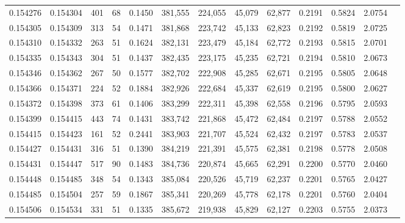 \begin{tabular}{rrrrrrrrrrrrr}
0.154276 & 0.154304 &   401 &  68 &                                     0.1450 & 381,555 & 224,055 &  45,079 &  62,877 & 0.2191 & 0.5824 & 2.0754 \\
0.154305 & 0.154309 &   313 &  54 &                                     0.1471 & 381,868 & 223,742 &  45,133 &  62,823 & 0.2192 & 0.5819 & 2.0725 \\
0.154310 & 0.154332 &   263 &  51 &                                     0.1624 & 382,131 & 223,479 &  45,184 &  62,772 & 0.2193 & 0.5815 & 2.0701 \\
0.154335 & 0.154343 &   304 &  51 &                                     0.1437 & 382,435 & 223,175 &  45,235 &  62,721 & 0.2194 & 0.5810 & 2.0673 \\
0.154346 & 0.154362 &   267 &  50 &                                     0.1577 & 382,702 & 222,908 &  45,285 &  62,671 & 0.2195 & 0.5805 & 2.0648 \\
0.154366 & 0.154371 &   224 &  52 &                                     0.1884 & 382,926 & 222,684 &  45,337 &  62,619 & 0.2195 & 0.5800 & 2.0627 \\
0.154372 & 0.154398 &   373 &  61 &                                     0.1406 & 383,299 & 222,311 &  45,398 &  62,558 & 0.2196 & 0.5795 & 2.0593 \\
0.154399 & 0.154415 &   443 &  74 &                                     0.1431 & 383,742 & 221,868 &  45,472 &  62,484 & 0.2197 & 0.5788 & 2.0552 \\
0.154415 & 0.154423 &   161 &  52 &                                     0.2441 & 383,903 & 221,707 &  45,524 &  62,432 & 0.2197 & 0.5783 & 2.0537 \\
0.154427 & 0.154431 &   316 &  51 &                                     0.1390 & 384,219 & 221,391 &  45,575 &  62,381 & 0.2198 & 0.5778 & 2.0508 \\
0.154431 & 0.154447 &   517 &  90 &                                     0.1483 & 384,736 & 220,874 &  45,665 &  62,291 & 0.2200 & 0.5770 & 2.0460 \\
0.154448 & 0.154485 &   348 &  54 &                                     0.1343 & 385,084 & 220,526 &  45,719 &  62,237 & 0.2201 & 0.5765 & 2.0427 \\
0.154485 & 0.154504 &   257 &  59 &                                     0.1867 & 385,341 & 220,269 &  45,778 &  62,178 & 0.2201 & 0.5760 & 2.0404 \\
0.154506 & 0.154534 &   331 &  51 &                                     0.1335 & 385,672 & 219,938 &  45,829 &  62,127 & 0.2203 & 0.5755 & 2.0373 \\

\end{tabular}
